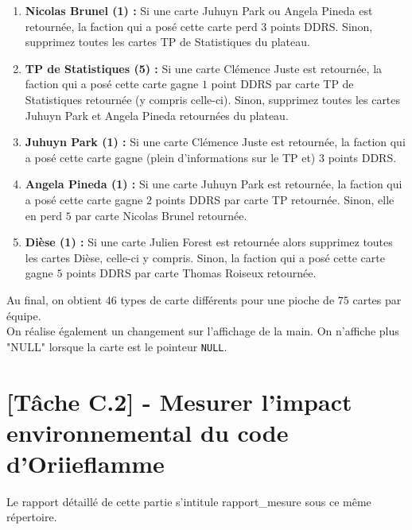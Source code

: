 \documentclass[12pt, openany]{report}
\begin{document}
\begin{enumerate}
		\item \textbf{Nicolas Brunel (1) :}
		Si une carte Juhuyn Park ou Angela Pineda est retournée, la faction qui a posé cette carte perd $3$ points DDRS. Sinon, supprimez toutes les cartes TP de Statistiques du plateau.
		\item \textbf{TP de Statistiques (5) :}
		Si une carte Clémence Juste est retournée, la faction qui a posé cette carte gagne $1$ point DDRS par carte TP de Statistiques retournée (y compris celle-ci). Sinon, supprimez toutes les cartes Juhuyn Park et Angela Pineda retournées du plateau.
		\item \textbf{Juhuyn Park (1) :}
		Si une carte Clémence Juste est retournée, la faction qui a posé cette carte gagne (plein d'informations sur le TP et) $3$ points DDRS.
		\item \textbf{Angela Pineda (1) :}
		Si une carte Juhuyn Park est retournée, la faction qui a posé cette carte gagne $2$ points DDRS par carte TP retournée. Sinon, elle en perd $5$ par carte Nicolas Brunel retournée.
		\item \textbf{Dièse (1) :}
		Si une carte Julien Forest est retournée alors supprimez toutes les cartes Dièse, celle-ci y compris. Sinon, la faction qui a posé cette carte gagne $5$ points DDRS par carte Thomas Roiseux retournée.
	\end{enumerate}
Au final, on obtient $46$ types de carte différents pour une pioche de $75$ cartes par équipe. \\
On réalise également un changement sur l'affichage de la main. On n'affiche plus "NULL" lorsque la carte est le pointeur \verb|NULL|.

\chapter{[Tâche C.2] - Mesurer l’impact environnemental du code d'Oriieflamme}
Le rapport détaillé de cette partie s'intitule rapport_mesure sous ce même répertoire.
\end{document}
